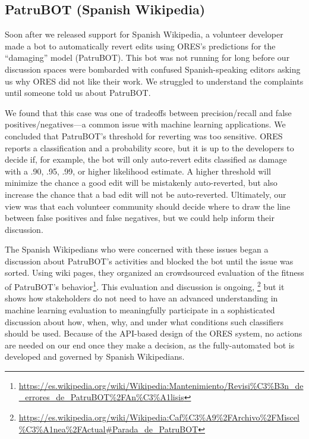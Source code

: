 \subsection{PatruBOT (Spanish Wikipedia)}
Soon after we released support for Spanish Wikipedia, a volunteer developer made a bot to automatically revert edits using ORES's predictions for the ``damaging'' model (PatruBOT).  This bot was not running for long before our discussion spaces were bombarded with confused Spanish-speaking editors asking us why ORES did not like their work.  We struggled to understand the complaints until someone told us about PatruBOT. 

We found that this case was one of tradeoffs between precision/recall and false positives/negatives---a common issue with machine learning applications. We concluded that PatruBOT's threshold for reverting was too sensitive. ORES reports a classification and a probability score, but it is up to the developers to decide if, for example, the bot will only auto-revert edits classified as damage with a .90, .95, .99, or higher likelihood estimate. A higher threshold will minimize the chance a good edit will be mistakenly auto-reverted, but also increase the chance that a bad edit will not be auto-reverted.  Ultimately, our view was that each volunteer community should decide where to draw the line between false positives and false negatives, but we could help inform their discussion.

The Spanish Wikipedians who were concerned with these issues began a discussion about PatruBOT's activities and blocked the bot until the issue was sorted. Using wiki pages, they organized an crowdsourced evaluation of the fitness of PatruBOT's behavior\footnote{\url{https://es.wikipedia.org/wiki/Wikipedia:Mantenimiento/Revisi\%C3\%B3n_de_errores_de_PatruBOT\%2FAn\%C3\%A1lisis}}.  This evaluation and discussion is ongoing, \footnote{\url{https://es.wikipedia.org/wiki/Wikipedia:Caf\%C3\%A9\%2FArchivo\%2FMiscel\%C3\%A1nea\%2FActual\#Parada_de_PatruBOT}} but it shows how stakeholders do not need to have an advanced understanding in machine learning evaluation to meaningfully participate in a sophisticated discussion about how, when, why, and under what conditions such classifiers should be used. Because of the API-based design of the ORES system, no actions are needed on our end once they make a decision, as the fully-automated bot is developed and governed by Spanish Wikipedians.

